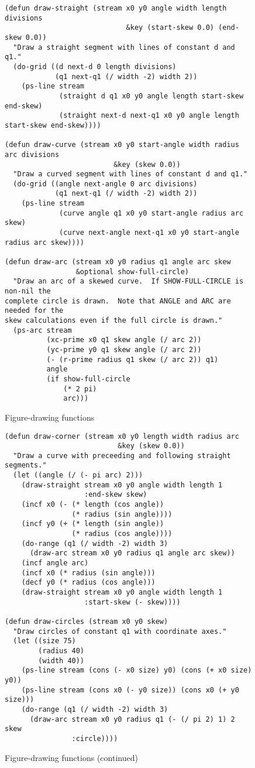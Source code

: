 \documentclass{article}
\begin{document}
\begin{figure}
  \centering
\begin{verbatim}
(defun draw-straight (stream x0 y0 angle width length divisions
                             &key (start-skew 0.0) (end-skew 0.0))
  "Draw a straight segment with lines of constant d and q1."
  (do-grid ((d next-d 0 length divisions)
            (q1 next-q1 (/ width -2) width 2))
    (ps-line stream
             (straight d q1 x0 y0 angle length start-skew end-skew)
             (straight next-d next-q1 x0 y0 angle length start-skew end-skew))))

(defun draw-curve (stream x0 y0 start-angle width radius arc divisions
                          &key (skew 0.0))
  "Draw a curved segment with lines of constant d and q1."
  (do-grid ((angle next-angle 0 arc divisions)
            (q1 next-q1 (/ width -2) width 2))
    (ps-line stream
             (curve angle q1 x0 y0 start-angle radius arc skew)
             (curve next-angle next-q1 x0 y0 start-angle radius arc skew))))

(defun draw-arc (stream x0 y0 radius q1 angle arc skew 
                 &optional show-full-circle)
  "Draw an arc of a skewed curve.  If SHOW-FULL-CIRCLE is non-nil the
complete circle is drawn.  Note that ANGLE and ARC are needed for the
skew calculations even if the full circle is drawn."
  (ps-arc stream 
          (xc-prime x0 q1 skew angle (/ arc 2)) 
          (yc-prime y0 q1 skew angle (/ arc 2)) 
          (- (r-prime radius q1 skew (/ arc 2)) q1)
          angle 
          (if show-full-circle 
              (* 2 pi)
              arc)))
\end{verbatim}
\caption{Figure-drawing functions}
\end{figure}

\begin{figure}
  \centering
\begin{verbatim}
(defun draw-corner (stream x0 y0 length width radius arc
                           &key (skew 0.0))
  "Draw a curve with preceeding and following straight segments."
  (let ((angle (/ (- pi arc) 2)))
    (draw-straight stream x0 y0 angle width length 1
                   :end-skew skew)
    (incf x0 (- (* length (cos angle))
                (* radius (sin angle))))
    (incf y0 (+ (* length (sin angle))
                (* radius (cos angle))))
    (do-range (q1 (/ width -2) width 3)
      (draw-arc stream x0 y0 radius q1 angle arc skew))
    (incf angle arc)
    (incf x0 (* radius (sin angle)))
    (decf y0 (* radius (cos angle)))
    (draw-straight stream x0 y0 angle width length 1 
                   :start-skew (- skew))))

(defun draw-circles (stream x0 y0 skew)
  "Draw circles of constant q1 with coordinate axes."
  (let ((size 75)
        (radius 40)
        (width 40))
    (ps-line stream (cons (- x0 size) y0) (cons (+ x0 size) y0))
    (ps-line stream (cons x0 (- y0 size)) (cons x0 (+ y0 size)))
    (do-range (q1 (/ width -2) width 3)
      (draw-arc stream x0 y0 radius q1 (- (/ pi 2) 1) 2 skew 
                :circle))))
\end{verbatim}
\caption{Figure-drawing functions (continued)}
\end{figure}
\end{document}

